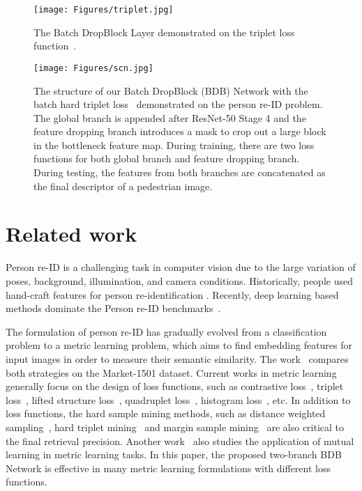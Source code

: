 \documentclass[10pt,twocolumn,letterpaper]{article}
\begin{document}
\begin{figure}
\texttt{[image: Figures/triplet.jpg]}
\caption{The Batch DropBlock Layer demonstrated on the triplet loss function~\cite{schroff2015facenet}.}
\label{fig:triplet}
\vspace{4mm}
\end{figure}

\begin{figure*}[h!]
\begin{center}
\texttt{[image: Figures/scn.jpg]}
\end{center}
\vspace{-4mm}
\caption{The structure of our Batch DropBlock (BDB) Network with the batch hard triplet loss~\cite{hermans2017defense} demonstrated on the person re-ID problem.
The global branch is appended after ResNet-50 Stage 4 and the feature dropping branch introduces a mask to crop out a large block in the bottleneck feature map. \textcolor{myRed}{During training, there are two loss functions for both global branch and feature dropping branch. During testing, the features from both branches} are concatenated as the final descriptor of a pedestrian image.}
\label{fig:bfe}
\vspace{-3mm}
\end{figure*}

\section{Related work}
Person re-ID is a challenging task in computer vision due to the large variation of poses, background, illumination, and camera conditions. 
Historically, people used hand-craft features for person re-identification \cite{bazzani2010multishot,das2014consistent,li2013local,liao2015person,ma2013domain,jurie2019pcca,pedagadi2013local,perina2010symmetry,yang2014salient,zheng2013reidentification}.
Recently, deep learning based methods dominate the Person re-ID benchmarks~\cite{chen2018group,shen2018group,sun2017svdnet,zhao2017deeply,zheng2016binary,zheng2017discriminatively}.

The formulation of person re-ID has gradually evolved from a classification problem to a metric learning problem, which aims to find embedding features for input images in order to measure their semantic similarity.
The work~\cite{zheng2016person} compares both strategies on the Market-1501 dataset.
Current works in metric learning generally focus on the design of loss functions, such as contrastive loss~\cite{varior2016contrastive}, triplet loss~\cite{cheng2016person,liu2017end}, lifted structure loss~\cite{oh2016deep}, quadruplet loss~\cite{chen2017beyond}, histogram loss~\cite{ustinova2016histogram}, etc. 
In addition to loss functions, the hard sample mining methods, such as distance weighted sampling~\cite{wu2017sampling}, hard triplet mining~\cite{hermans2017defense} and margin sample mining~\cite{xiao2017margin} are also critical to the final retrieval precision. 
Another work~\cite{zhang2017alignedreid} also studies the application of mutual learning in metric learning tasks.
In this paper, the proposed two-branch BDB Network is effective in many metric learning formulations with different loss functions. 
\end{document}
